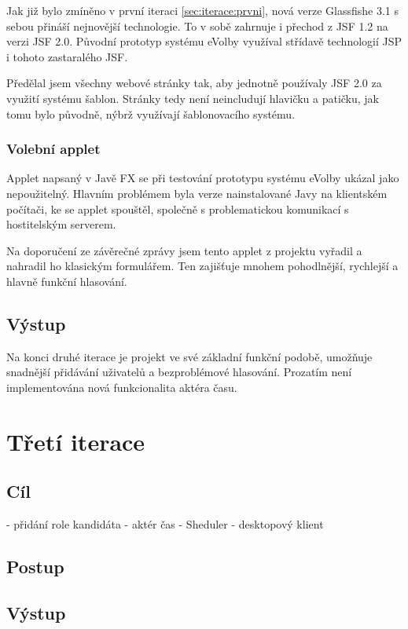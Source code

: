 \documentclass[11pt,twoside,a4paper]{book}
\begin{document}
Jak již bylo zmíněno v první iteraci \ref{sec:iterace:prvni}, nová verze Glassfishe 3.1 s sebou přináší nejnovější technologie. To v sobě zahrnuje i přechod z JSF 1.2 na verzi JSF 2.0. Původní prototyp systému eVolby\cite{www:prototyp} využíval střídavě technologií JSP i tohoto zastaralého JSF.

Předělal jsem všechny webové stránky tak, aby jednotně používaly JSF 2.0 za využití systému šablon. Stránky tedy není neincludují hlavičku a patičku, jak tomu bylo původně, nýbrž využívají šablonovacího systému.

\subsubsection{Volební applet}

Applet napsaný v Javě FX se při testování prototypu systému eVolby\cite{www:prototyp} ukázal jako nepoužitelný. Hlavním problémem byla verze nainstalované Javy na klientském počítači, ke se applet spouštěl, společně s problematickou komunikací s hostitelským serverem.

Na doporučení ze závěrečné zprávy jsem tento applet z projektu vyřadil a nahradil ho klasickým formulářem. Ten zajišťuje mnohem pohodlnější, rychlejší a hlavně funkční hlasování.

\subsection{Výstup}

Na konci druhé iterace je projekt ve své základní funkční podobě, umožňuje snadnější přidávání uživatelů a bezproblémové hlasování. Prozatím není implementována nová funkcionalita aktéra času.

\section{Třetí iterace}

\subsection{Cíl}

- přidání role kandidáta
- aktér čas - Sheduler
- desktopový klient

\subsection{Postup}

\subsection{Výstup}
\end{document}
